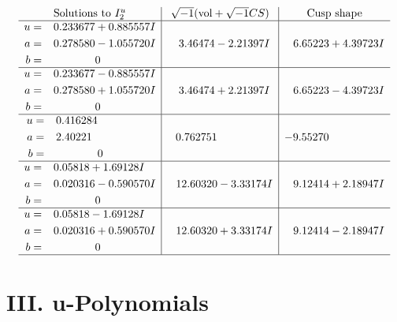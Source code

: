 \documentclass[1p]{elsarticle_modified}
\theoremstyle{definition}
\newcommand{\I}{\sqrt{-1}}
\begin{document}
$$\begin{array}{c|c|c}  
\text{Solutions to }I^u_{2}& \I (\text{vol} + \sqrt{-1}CS) & \text{Cusp shape}\\
 \hline 
\begin{aligned}
u &= \phantom{-}0.233677 + 0.885557 I \\
a &= \phantom{-}0.278580 - 1.055720 I \\
b &= \phantom{-0.000000 } 0\end{aligned}
 & \phantom{-}3.46474 - 2.21397 I & \phantom{-}6.65223 + 4.39723 I \\ \hline\begin{aligned}
u &= \phantom{-}0.233677 - 0.885557 I \\
a &= \phantom{-}0.278580 + 1.055720 I \\
b &= \phantom{-0.000000 } 0\end{aligned}
 & \phantom{-}3.46474 + 2.21397 I & \phantom{-}6.65223 - 4.39723 I \\ \hline\begin{aligned}
u &= \phantom{-}0.416284\phantom{ +0.000000I} \\
a &= \phantom{-}2.40221\phantom{ +0.000000I} \\
b &= \phantom{-0.000000 } 0\end{aligned}
 & \phantom{-}0.762751\phantom{ +0.000000I} & -9.55270\phantom{ +0.000000I} \\ \hline\begin{aligned}
u &= \phantom{-}0.05818 + 1.69128 I \\
a &= \phantom{-}0.020316 - 0.590570 I \\
b &= \phantom{-0.000000 } 0\end{aligned}
 & \phantom{-}12.60320 - 3.33174 I & \phantom{-}9.12414 + 2.18947 I \\ \hline\begin{aligned}
u &= \phantom{-}0.05818 - 1.69128 I \\
a &= \phantom{-}0.020316 + 0.590570 I \\
b &= \phantom{-0.000000 } 0\end{aligned}
 & \phantom{-}12.60320 + 3.33174 I & \phantom{-}9.12414 - 2.18947 I\\
 \hline 
 \end{array}$$\newpage
\newpage\renewcommand{\arraystretch}{1}
\centering \section*{ III. u-Polynomials}
\end{document}
